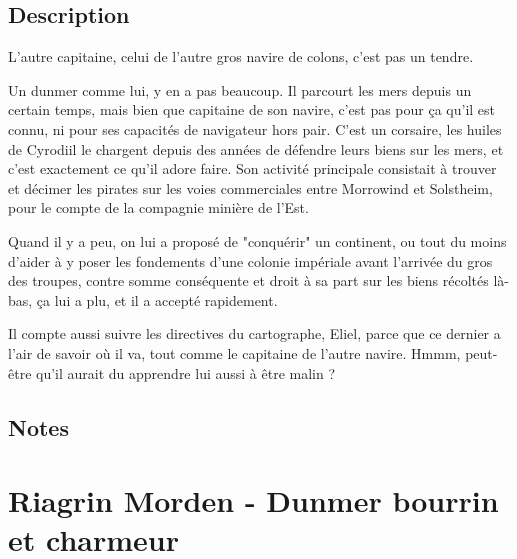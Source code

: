 \documentclass{Tamriel}
\begin{document}
\begin{multicols*}{2}
\raggedcolumns

        \section*{Description}
        
        L'autre capitaine, celui de l'autre gros navire de colons, c'est pas un tendre.
        
        Un dunmer comme lui, y en a pas beaucoup. Il parcourt les mers depuis un certain temps, mais bien que capitaine de son navire, c'est pas pour ça qu'il est connu, ni pour ses capacités de navigateur hors pair. C'est un corsaire, les huiles de Cyrodiil le chargent depuis des années de défendre leurs biens sur les mers, et c'est exactement ce qu'il adore faire. Son activité principale consistait à trouver et décimer les pirates sur les voies commerciales entre Morrowind et Solstheim, pour le compte de la compagnie minière de l'Est.
        
        Quand il y a peu, on lui a proposé de "conquérir" un continent, ou tout du moins d'aider à y poser les fondements d'une colonie impériale avant l'arrivée du gros des troupes, contre somme conséquente et droit à sa part sur les biens récoltés là-bas, ça lui a plu, et il a accepté rapidement.
        
        Il compte aussi suivre les directives du cartographe, Eliel, parce que ce dernier a l'air de savoir où il va, tout comme le capitaine de l'autre navire. Hmmm, peut-être qu'il aurait du apprendre lui aussi à être malin ?
        
        \columnbreak

        \section*{Notes}
        
\end{multicols*}

\chapter*{Riagrin Morden - Dunmer bourrin et charmeur}
\end{document}
